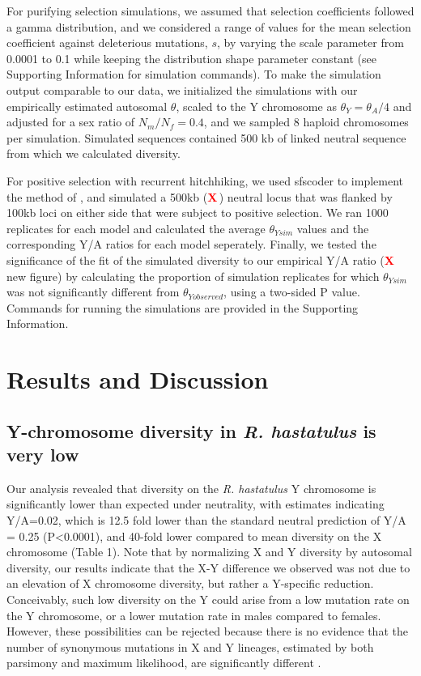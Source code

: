 \documentclass[9pt,twocolumn,twoside]{gsajnl}
\newcommand{\X}{\textcolor{red}{\bf X\,}}
\begin{document}
For purifying selection simulations, we assumed that selection coefficients followed a gamma distribution, and we considered a range of values for the mean selection coefficient against deleterious mutations, $s$, by varying the scale parameter from 0.0001 to 0.1 while keeping the distribution shape parameter constant (see Supporting Information for simulation commands). To make the simulation output comparable to our data, we initialized the simulations with our empirically estimated autosomal $\theta$, scaled to the Y chromosome as $\theta_{Y}=\theta_{A}/4$ and adjusted for a sex ratio of $N_{m}/N_{f}=0.4$, and we sampled 8 haploid chromosomes per simulation. Simulated sequences contained 500 kb of linked neutral sequence from which we calculated diversity. 

For positive selection with recurrent hitchhiking, we used sfscoder to implement the method of \citep{uricchio2014robust}, and simulated a 500kb (\X) neutral locus that was flanked by 100kb loci on either side that were subject to positive selection. We ran 1000 replicates for each model and calculated the average $\theta_{Y{sim}}$ values and the corresponding Y/A ratios for each model seperately. Finally, we tested the significance of the fit of the simulated diversity to our empirical Y/A ratio (\X new figure) by calculating the proportion of simulation replicates for which $\theta_{{Y}sim}$ was not significantly different from $\theta_{{Y}observed}$, using a two-sided P value. Commands for running the simulations are provided in the Supporting Information. 

\section*{Results and Discussion}

\subsection*{Y-chromosome diversity in \textit{R. hastatulus} is very low}
Our analysis revealed that diversity on the \textit{R. hastatulus} Y chromosome is significantly lower than expected under neutrality, with estimates indicating Y/A=0.02, which is 12.5 fold lower than the standard neutral prediction of Y/A = 0.25 (P<0.0001), and 40-fold lower compared to mean diversity on the X chromosome (Table 1). Note that by normalizing X and Y diversity by autosomal diversity, our results indicate that the X-Y difference we observed was not due to an elevation of X chromosome diversity, but rather a Y-specific reduction. Conceivably, such low diversity on the Y could arise from a low mutation rate on the Y chromosome, or a lower mutation rate in males compared to females. However, these possibilities can be rejected because there is no evidence that the number of synonymous mutations in X and Y lineages, estimated by both parsimony and maximum likelihood, are significantly different \citep{hough2014}. 
\end{document}
